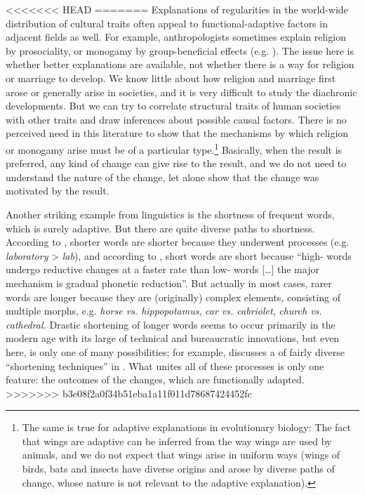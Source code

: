 \documentclass[output=paper]{langsci/langscibook}
\begin{document}
<<<<<<< HEAD
=======
Explanations of regularities in the world-wide distribution of cultural traits often appeal to functional-adaptive factors in adjacent fields as well. For example, anthropologists sometimes explain religion by prosociality, or monogamy by group-beneficial effects (e.g. \citealt{PaciottiEtAl2011,HenrichEtAl2012}). The issue here is whether better explanations are available, not whether there is a way for religion or marriage to develop. We know little about how religion and marriage first arose or generally arise in societies, and it is very difficult to study the diachronic developments. But we can try to correlate structural traits of human societies with other traits and draw inferences about possible causal factors. There is no perceived need in this literature to show that the mechanisms by which religion or monogamy arise must be of a particular type.\footnote{The same is true for adaptive explanations in evolutionary biology: The fact that wings are adaptive can be inferred from the way wings are used by animals, and we do not expect that wings arise in uniform ways (wings of birds, bats and insects have diverse origins and arose by diverse paths of change, whose nature is not relevant to the adaptive explanation).} Basically, when the result is preferred, any kind of change can give rise to the result, and we do not need to understand the nature of the change, let alone show that the change was motivated by the result.

\largerpage
Another striking example from linguistics is the shortness of frequent words, which is surely adaptive. But there are quite diverse paths to shortness. According to \citet{Zipf1935}, shorter words are shorter because they underwent  processes (e.g. \textit{laboratory} > \textit{lab}), and according to \citet[12]{Bybee2007}, short words are short because “high- words undergo reductive changes at a faster rate than low- words […] the major mechanism is gradual phonetic reduction”. But actually in most cases, rarer words are longer because they are (originally) complex elements, consisting of multiple morphs, e.g. \textit{horse vs. hippopotamus}, \textit{car vs. cabriolet}, \textit{church vs. cathedral.} Drastic shortening of longer words seems to occur primarily in the modern age with its large  of technical and bureaucratic innovations, but even here,  is only one of many possibilities; for example, \citet{RonnebergerSibold2014} discusses a  of fairly diverse “shortening techniques” in . What unites all of these processes is only one feature: the outcomes of the changes, which are functionally adapted.
>>>>>>> b3e08f2a0f34b51eba1a11f011d78687424452fc
\end{document}
